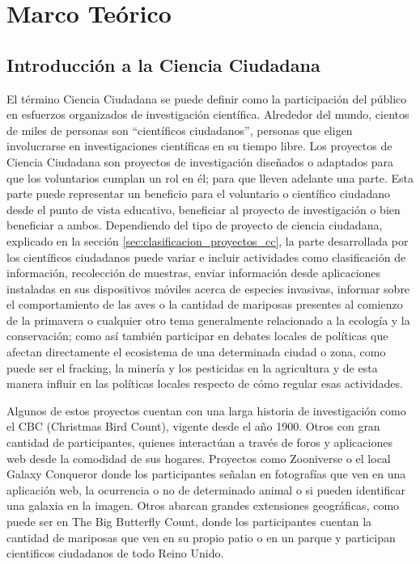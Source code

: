 \chapter{Marco Teórico}
		
	
\section{Introducción a la Ciencia Ciudadana}
    
    El término Ciencia Ciudadana se puede definir como la participación del público en esfuerzos organizados de investigación científica. Alrededor del mundo, cientos de miles de personas son ``científicos ciudadanos'', personas que eligen involucrarse en investigaciones científicas en su tiempo libre. \cite{louv2012citizen} Los proyectos de Ciencia Ciudadana son proyectos de investigación diseñados o adaptados para que los voluntarios cumplan un rol en él; para que lleven adelante una parte. Esta parte puede representar un beneficio para el voluntario o científico ciudadano desde el punto de vista educativo, beneficiar al proyecto de investigación o bien beneficiar a ambos.\cite{silvertown2009new} Dependiendo del tipo de proyecto de ciencia ciudadana, explicado en la sección \ref{sec:clasificacion_proyectos_cc}, la parte desarrollada por los científicos ciudadanos puede variar e incluir actividades como clasificación de información, recolección de muestras, enviar información desde aplicaciones instaladas en sus dispositivos móviles acerca de especies invasivas, informar sobre el comportamiento de las aves o la cantidad de mariposas presentes al comienzo de la primavera o cualquier otro tema generalmente relacionado a la ecología y la conservación; como así también participar en debates locales de políticas que afectan directamente el ecosistema de una determinada ciudad o zona, como puede ser el fracking, la minería y los pesticidas en la agricultura y de esta manera influir en las políticas locales respecto de cómo regular esas actividades.\cite{envCitizenScience}
    
	Algunos de estos proyectos cuentan con una larga historia de investigación como el CBC (Christmas Bird Count), vigente desde el año 1900. Otros con gran cantidad de participantes, quienes interactúan a través de foros y aplicaciones web desde la comodidad de sus hogares. Proyectos como Zooniverse o el local Galaxy Conqueror donde los participantes señalan en fotografías que ven en una aplicación web, la ocurrencia o no de determinado animal o si pueden identificar una galaxia en la imagen. Otros abarcan grandes extensiones geográficas, como puede ser en The Big Butterfly Count, donde los participantes cuentan la cantidad de mariposas que ven en su propio patio o en un parque y participan cientificos ciudadanos de todo Reino Unido. \cite{shirk2012public} 
		
